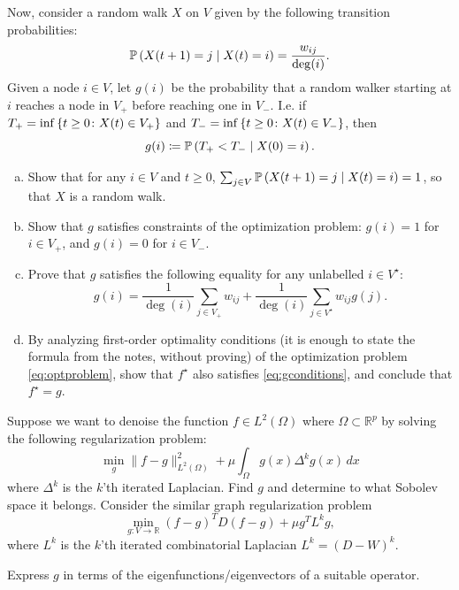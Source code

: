 \begin{myexercise}
    Now, consider a random walk $X$ on $V$ given by the following transition probabilities:
    \begin{equation*}
        \mathbb{P}\left( X(t+1)=j\mid X(t)=i \right) = \frac{w_{ij}}{\deg(i)}.
    \end{equation*}
    Given a node $i \in V$, let $g(i)$ be the probability that a random walker starting at $i$ reaches a node in $V_{+}$ before reaching one in $V_{\scriptstyle -}$. I.e. if $T_{+} = \inf\left\{ t \geq 0 \colon X(t) \in V_{+} \right\}$ and $T_{\scriptstyle -} = \inf\left\{ t \geq 0 \colon X(t) \in V_{\scriptstyle -} \right\}$, then
    \begin{equation*}
        g(i) \coloneqq \mathbb{P}\left( T_{\scriptstyle +} < T_{\scriptstyle -} \mid X(0)=i \right).
    \end{equation*}
    \begin{enumerate}[(a)]
        \item Show that for any $i \in V$ and $t \geq 0$, $\sum_{j \in V} \mathbb{P}\left( X(t+1)=j\mid X(t)=i \right) = 1$, so that $X$ is a random walk.
        \item Show that $g$ satisfies constraints of the optimization problem: $g(i) = 1$ for $i \in V_{+}$, and $g(i) = 0$ for $i \in V_{\scriptstyle -}$.
        \item Prove that $g$ satisfies the following equality for any unlabelled $i \in V^\star$:
        \begin{equation}\label{eq:gconditions}
            g(i) = \frac{1}{\deg(i)} \sum_{j\in V_{+}} w_{ij} +  \frac{1}{\deg(i)} \sum_{j\in V^{\star}} w_{ij} g(j).
        \end{equation}
        \item By analyzing first-order optimality conditions (it is enough to state the formula from the notes, without proving) of the optimization problem \eqref{eq:optproblem}, show that $f^\star$ also satisfies \eqref{eq:gconditions}, and conclude that $f^\star = g$.
    \end{enumerate}
\end{myexercise}

\begin{myexercise}
Suppose we want to denoise the function $f \in L^2(\Omega)$ where $\Omega \subset \mathbb{R}^p$ by solving the following regularization problem:
$$\min_g \|f-g\|^2_{L^2(\Omega)} + \mu\int_\Omega g(x) \Delta^k g(x) \,dx$$
where $\Delta^k$ is the $k$'th iterated Laplacian. Find $g$ and determine to what Sobolev space it belongs. Consider the similar graph regularization problem
$$\min_{g:V\to \mathbb{R}} (f-g)^T D (f-g) + \mu g^T L^k g,$$
where $L^k$ is the $k$'th iterated combinatorial Laplacian $L^k=(D-W)^k$.\\
\begin{hint}
Express $g$ in terms of the eigenfunctions/eigenvectors of a suitable operator.    
\end{hint}
\end{myexercise}
 
